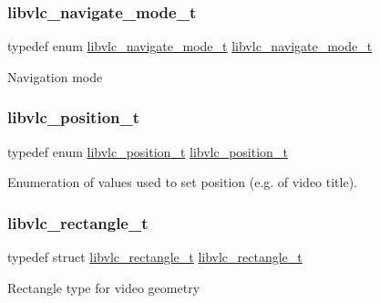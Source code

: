\subsubsection{\texorpdfstring{libvlc\+\_\+navigate\+\_\+mode\+\_\+t}{libvlc\_navigate\_mode\_t}}
{\footnotesize\ttfamily typedef enum \hyperlink{group__libvlc__media__player_ga6e6b601e219aafd4ffc6063c1dbf11b1}{libvlc\+\_\+navigate\+\_\+mode\+\_\+t}  \hyperlink{group__libvlc__media__player_ga6e6b601e219aafd4ffc6063c1dbf11b1}{libvlc\+\_\+navigate\+\_\+mode\+\_\+t}}

Navigation mode \mbox{\label{group__libvlc__media__player_gad591cf9e00646a6e95199a1acb4b4bd2}} 
\subsubsection{\texorpdfstring{libvlc\+\_\+position\+\_\+t}{libvlc\_position\_t}}
{\footnotesize\ttfamily typedef enum \hyperlink{group__libvlc__media__player_ga948997d1c6ab5fee8051417ac7dfa1c7}{libvlc\+\_\+position\+\_\+t}  \hyperlink{group__libvlc__media__player_ga948997d1c6ab5fee8051417ac7dfa1c7}{libvlc\+\_\+position\+\_\+t}}

Enumeration of values used to set position (e.\+g. of video title). \mbox{\label{group__libvlc__media__player_gad0cdc4dd53f2b27a293bdb2f25f195f8}} 
\subsubsection{\texorpdfstring{libvlc\+\_\+rectangle\+\_\+t}{libvlc\_rectangle\_t}}
{\footnotesize\ttfamily typedef struct \hyperlink{structlibvlc__rectangle__t}{libvlc\+\_\+rectangle\+\_\+t}  \hyperlink{structlibvlc__rectangle__t}{libvlc\+\_\+rectangle\+\_\+t}}

Rectangle type for video geometry \mbox{\label{group__libvlc__media__player_gada3edbe8acd22ebc12e33993330e0494}} 
